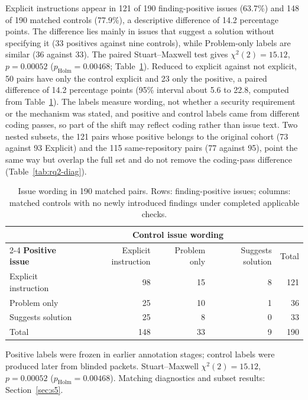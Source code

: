 \documentclass[acmsmall,screen,nonacm]{acmart}
\begin{document}
Explicit instructions appear in 121 of 190 finding-positive issues (63.7\%) and 148 of 190 matched controls (77.9\%), a descriptive difference of 14.2 percentage points. The difference lies mainly in issues that suggest a solution without specifying it (33 positives against nine controls), while Problem-only labels are similar (36 against 33). The paired Stuart--Maxwell test gives $\chi^2(2)=15.12$, $p=0.00052$ ($p_{\mathrm{Holm}}=0.00468$; Table~\ref{tab:rq2}). Reduced to explicit against not explicit, 50 pairs have only the control explicit and 23 only the positive, a paired difference of 14.2 percentage points (95\% interval about 5.6 to 22.8, computed from Table~\ref{tab:rq2}). The labels measure wording, not whether a security requirement or the mechanism was stated, and positive and control labels came from different coding passes, so part of the shift may reflect coding rather than issue text. Two nested subsets, the 121 pairs whose positive belongs to the original cohort (73 against 93 Explicit) and the 115 same-repository pairs (77 against 95), point the same way but overlap the full set and do not remove the coding-pass difference (Table~\ref{tab:rq2-diag}).

\begin{table}[!tbp]
\caption{Issue wording in 190 matched pairs. Rows: finding-positive issues; columns: matched controls with no newly introduced findings under completed applicable checks.}
\label{tab:rq2}
\small
\begin{tabular}{@{}lrrrr@{}}
\toprule
& \multicolumn{3}{c}{\textbf{Control issue wording}} & \\
\cmidrule(lr){2-4}
\textbf{Positive issue} & Explicit instruction & Problem only & Suggests solution & Total\\
\midrule
Explicit instruction & 98 & 15 & 8 & 121\\
Problem only & 25 & 10 & 1 & 36\\
Suggests solution & 25 & 8 & 0 & 33\\
\midrule
Total & 148 & 33 & 9 & 190\\
\bottomrule
\end{tabular}
\par\smallskip\raggedright\footnotesize Positive labels were frozen in earlier annotation stages; control labels were produced later from blinded packets. Stuart--Maxwell $\chi^2(2)=15.12$, $p=0.00052$ ($p_{\mathrm{Holm}}=0.00468$). Matching diagnostics and subset results: Section~\ref{sec:s5}.
\end{table}
\end{document}

